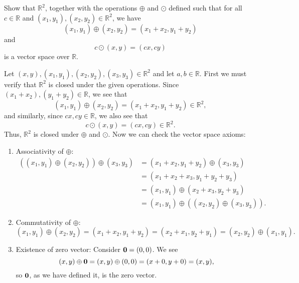 \begin{exmp}
Show that $ \mathbb{R}^2 $, together with the operations $ \oplus $ and $ \odot $ defined such that for all $ c\in\mathbb{R} $ and $ (x_1,y_1),(x_2,y_2)\in\mathbb{R}^2 $, we have
\begin{equation*}
    (x_1,y_1)\oplus(x_2,y_2)=(x_1+x_2,y_1+y_2)
\end{equation*}
and
\begin{equation*}
    c\odot(x,y)=(cx,cy)
\end{equation*}
is a vector space over $ \mathbb{R} $.
\end{exmp}
\begin{sltn}
Let $ (x,y),(x_1,y_1),(x_2,y_2),(x_3,y_3)\in\mathbb{R}^2 $ and let $ a,b\in\mathbb{R} $. First we must verify that $ \mathbb{R}^2 $ is closed under the given operations. Since $ (x_1+x_2),(y_1+y_2)\in\mathbb{R} $, we see that
\begin{equation*}
    (x_1,y_1)\oplus(x_2,y_2)=(x_1+x_2,y_1+y_2)\in\mathbb{R}^2,
\end{equation*}
and similarly, since $ cx,cy\in\mathbb{R} $, we also see that
\begin{equation*}
    c\odot(x,y)=(cx,cy)\in\mathbb{R}^2.
\end{equation*}
Thus, $ \mathbb{R}^2 $ is closed under $ \oplus $ and $ \odot $. Now we can check the vector space axioms:
\begin{enumerate}
    \item Associativity of $ \oplus $:
    \begin{align*}
        ((x_1,y_1)\oplus(x_2,y_2))\oplus(x_3,y_3) &= (x_1+x_2,y_1+y_2)\oplus(x_3,y_3) \\
        &= (x_1+x_2+x_3,y_1+y_2+y_3) \\
        &= (x_1,y_1)\oplus(x_2+x_3,y_2+y_3) \\
        &= (x_1,y_1)\oplus((x_2,y_2)\oplus(x_3,y_3)).
    \end{align*}

    \item Commutativity of $ \oplus $:
    \begin{equation*}
        (x_1,y_1)\oplus(x_2,y_2)=(x_1+x_2,y_1+y_2)=(x_2+x_1,y_2+y_1)=(x_2,y_2)\oplus(x_1,y_1).
    \end{equation*}

    \item Existence of zero vector: Consider $ \boldsymbol{\mathbf{0}}=(0,0) $. We see
    \begin{equation*}
        (x,y)\oplus\boldsymbol{\mathbf{0}}=(x,y)\oplus(0,0)=(x+0,y+0)=(x,y),
    \end{equation*}
    so $ \boldsymbol{\mathbf{0}} $, as we have defined it, is the zero vector.


\end{enumerate}
\end{sltn}
